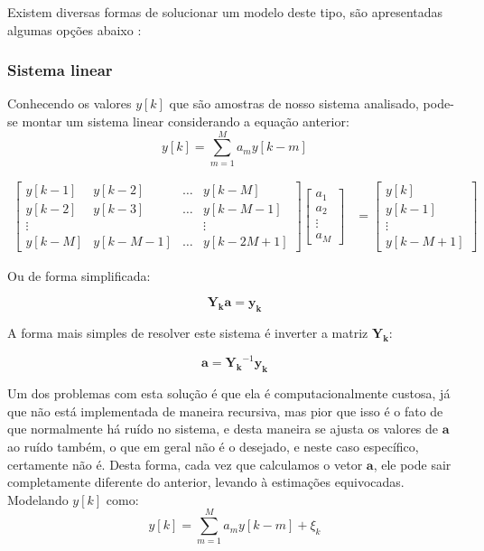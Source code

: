 Existem diversas formas de solucionar um modelo deste tipo, são apresentadas algumas opções abaixo \cite{haykin2005adaptive}:

\subsubsection{Sistema linear}

Conhecendo os valores $y[k]$ que são amostras de nosso sistema analisado, pode-se montar um sistema linear considerando a equação anterior:
\begin{equation}
y[k]=\sum_{m=1}^{M}a_m y[k-m]
\end{equation}

\begin{equation}
\begin{split}
\begin{bmatrix}
y[k-1] & y[k-2] & \dots & y[k-M] \\
y[k-2] & y[k-3] & \dots & y[k-M-1] \\
\vdots & & & \vdots\\
y[k-M] & y[k-M-1] & \dots & y[k-2M+1]
\end{bmatrix}
\begin{bmatrix}
a_1 \\ a_2 \\ \vdots \\ a_M
\end{bmatrix}
&
= 
\begin{bmatrix}
y[k] \\ y[k-1] \\ \vdots \\ y[k-M+1]
\end{bmatrix}
\end{split}
\end{equation}

Ou de forma simplificada:

\begin{equation}
\boldsymbol{Y_k}\boldsymbol{a}=\boldsymbol{y_k}
\end{equation}

A forma mais simples de resolver este sistema é inverter a matriz $\boldsymbol{Y_k}$:

\begin{equation}
\boldsymbol{a}=\boldsymbol{Y_k}^{-1}\boldsymbol{y_k}
\end{equation}

Um dos problemas com esta solução é que ela é computacionalmente custosa, já  que não está implementada de maneira recursiva, mas pior que isso é o fato de que normalmente há ruído no sistema, e desta maneira se ajusta os valores de $\boldsymbol{a}$ ao ruído também, o que em geral não é o desejado, e neste caso específico, certamente não é. Desta forma, cada vez que calculamos o vetor $\boldsymbol{a}$, ele pode sair completamente diferente do anterior, levando à estimações equivocadas. Modelando $y[k]$ como:
\begin{equation}
y[k]=\sum_{m=1}^{M}a_m y[k-m]+\xi_k
\end{equation}

